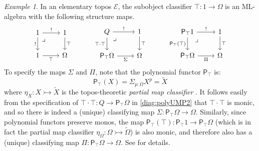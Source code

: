 \documentclass[12pt,reqno]{amsart}
\newcommand{\EE}{\ensuremath{\mathcal{E}}}
\newcommand{\alg}[1]{\ensuremath{\mathsf{#1}}}
\newcommand{\mono}{\ensuremath{\rightarrowtail}}
\renewcommand{\to}{\ensuremath{\rightarrow}}
\newcommand{\pbcorner}{\arrow[dr,phantom,"\lrcorner" very near start, shift right=.5ex]} %
\theoremstyle{remark}
\newtheorem{example}[theorem]{Example}
\theoremstyle{definition}
\begin{document}
\begin{example}\label{example:soc}
In an elementary topos $\EE$, the subobject classifier $\top : 1\to \Omega$ is an ML-algebra with the following structure maps.
\begin{equation*}\label{diag:MLalgO}
\begin{tikzcd}
	1 \ar[r,"!"] \ar[d,swap,"!"] \pbcorner & 1 \ar[d, "\top"]\\  
	1 \ar[r, swap,"\top"] & \Omega
 \end{tikzcd}\qquad\quad
 \begin{tikzcd}
	Q  \ar[r,"!"] \ar[d,swap,"{\top\cdot\top}"] \pbcorner &  1 \ar[d, "\top"]\\  
	\alg{P}_\top\Omega \ar[r,swap, "\Sigma"] & \Omega
\end{tikzcd} \qquad\quad
	 \begin{tikzcd}
	\alg{P}_{\top}1 \ar[d,swap,"\alg{P}_{\top}(\top)"] \ar[r,"!"] \pbcorner &  1 \ar[d, "\top"]\\  
	\alg{P}_{\top}\Omega \ar[r,swap, "\Pi"] & \Omega
 \end{tikzcd} 
 \end{equation*}
To specify the maps $\Sigma$ and $\Pi$, note that the polynomial functor $\alg{P}_\top$ is:
 \[
 \alg{P}_\top(X) = \Sigma_{p:\Omega}X^p = \widetilde{X}
 \]
where $\eta_X : X \mono \widetilde{X}$ is the topos-theoretic \emph{partial map classifier} \cite[Proposition A.2.4.7]{Johnstone:Elephant}. 
It follows easily from the specification of $\top\cdot\top : Q \to \alg{P}_\top\Omega$ in \eqref{diag:polyUMP2} that $\top\cdot\top$ is monic, and so there is indeed a (unique) classifying map $\Sigma : \alg{P}_{\top}\Omega \to \Omega$.   Similarly, since polynomial functors preserve monos, the map $\alg{P}_{\top}(\top) : \alg{P}_{\top}1 \to \alg{P}_{\top}\Omega$ (which is in fact the partial map classifier $\eta_\Omega : \Omega \mono \widetilde{\Omega}$) is also monic, and therefore also has a (unique) classifying map  $\Pi :\alg{P}_{\top}\Omega \to \Omega$.  See \cite[\S 6]{AGH} for details. 
\end{example}
%
\end{document}
